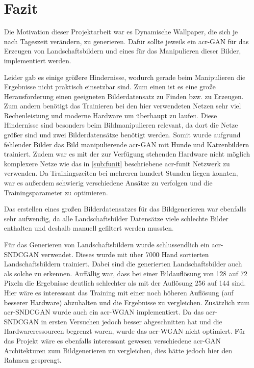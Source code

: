 \chapter{Fazit}\label{chp:fazit} %
\glsresetall

Die Motivation dieser Projektarbeit war es Dynamische Wallpaper, die sich je nach 
Tageszeit verändern, zu generieren. Dafür sollte jeweils ein \gls{acr-GAN} für das 
Erzeugen von Landschaftsbildern und eines für das Manipulieren dieser Bilder, 
implementiert werden. 

Leider gab es einige größere Hindernisse, wodurch gerade beim 
Manipulieren die Ergebnisse nicht praktisch einsetzbar sind. Zum einen ist es eine große 
Herausforderung einen geeigneten Bilderdatensatz zu Finden bzw. zu Erzeugen. Zum 
andern benötigt das Trainieren bei den hier verwendeten Netzen sehr viel Rechenleistung 
und moderne Hardware um überhaupt zu laufen. Diese Hindernisse sind besonders beim 
Bildmanipulieren relevant, da dort die Netze größer sind und zwei Bilderdatensätze 
benötigt werden. Somit wurde aufgrund fehlender Bilder das Bild manipulierende 
\gls{acr-GAN} mit Hunde und Katzenbildern trainiert. Zudem war es mit der zur Verfügung 
stehenden Hardware nicht möglich komplexere Netze wie das in \cref{sub:funit} 
beschriebene \gls{acr-funit} Netzwerk zu verwenden. Da Trainingszeiten bei mehreren 
hundert Stunden liegen konnten, war es außerdem schwierig verschiedene Ansätze zu 
verfolgen und die Trainingsparameter zu optimieren. 

Das erstellen eines großen Bilderdatensatzes für das Bildgenerieren war ebenfalls sehr 
aufwendig, da alle Landschaftsbilder Datensätze viele schlechte Bilder enthalten und 
deshalb manuell gefiltert werden mussten. 

Für das Generieren von Landschaftsbildern wurde schlussendlich ein \gls{acr-SNDCGAN} 
verwendet. Dieses wurde mit über 7000 Hand sortierten Landschaftsbildern trainiert. 
Dabei sind die generierten Landschaftsbilder auch als solche zu erkennen. Auffällig war, 
dass bei einer Bildauflösung von 128 auf 72 Pixeln die Ergebnisse deutlich schlechter als 
mit der Auflösung 256 auf 144 sind. Hier wäre es interessant das Training mit einer noch 
höheren Auflösung (auf besserer Hardware) abzuhalten und die Ergebnisse zu vergleichen. 
Zusätzlich zum  \gls{acr-SNDCGAN}  wurde auch ein \gls{acr-WGAN} implementiert. Da 
das \gls{acr-SNDCGAN} in ersten Versuchen jedoch besser abgeschnitten hat und die 
Hardwareressourcen begrenzt waren, wurde das \gls{acr-WGAN} nicht optimiert. Für das 
Projekt wäre es ebenfalls interessant gewesen verschiedene \gls{acr-GAN} Architekturen 
zum Bildgenerieren zu vergleichen, dies hätte jedoch hier den Rahmen gesprengt.

